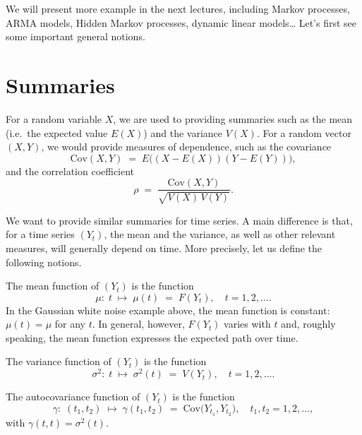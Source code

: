 \documentclass[dvipsnames,12pt]{book}
\begin{document}
                We will present more example in the next lectures, including Markov processes, ARMA models, Hidden Markov processes, dynamic linear models\ldots\! Let’s first see some important general notions.

\newpage
        \section{Summaries}

            For a random variable $X$, we are used to providing summaries such as the mean (i.e.\ the expected value $E(X)$) and the variance $V(X)$. For a random vector $(X,Y)$, we would provide measures of dependence, such as the covariance
            \begin{equation}
                \mathrm{Cov}(X,Y) \;=\; E\bigl((X - E(X))(Y - E(Y))\bigr),
            \end{equation}
            and the correlation coefficient
            \begin{equation}
                \rho \;=\; \frac{\mathrm{Cov}(X,Y)}{\sqrt{V(X)\,V(Y)}}.
            \end{equation}

            We want to provide similar summaries for time series. A main difference is that, for a time series $(Y_t)$, the mean and the variance, as well as other relevant measures, will generally depend on time. More precisely, let us define the following notions.

            \begin{definition}
                The mean function of $(Y_t)$ is the function
                \[
                \mu:\; t \;\mapsto\; \mu(t) \;=\; F(Y_t), 
                \quad t = 1, 2, \ldots.
                \]
                In the Gaussian white noise example above, the mean function is constant: $\mu(t) = \mu$ for any $t$. In general, however, $F(Y_t)$ varies with $t$ and, roughly speaking, the mean function expresses the expected path over time.
            \end{definition}

            \begin{definition}
                The variance function of $(Y_t)$ is the function
                \[
                \sigma^2:\; t \;\mapsto\; \sigma^2(t) \;=\; V(Y_t), \quad t = 1, 2, \ldots.
                \]
            \end{definition}

            \begin{definition}
                The autocovariance function of $(Y_t)$ is the function
                \[
                \gamma:\; (t_1, t_2) \;\mapsto\; \gamma(t_1, t_2) \;=\; \mathrm{Cov}\bigl(Y_{t_1}, Y_{t_2}\bigr),\quad t_1, t_2 = 1, 2, \ldots,
                \]
                with $\gamma(t, t) = \sigma^2(t)$.
            \end{definition}
\end{document}
